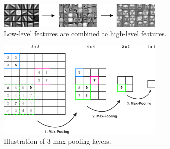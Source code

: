 \begin{figure}
    \begin{subfigure}{1\textwidth}
        \centering
        \includegraphics[width=0.9\textwidth]{resources/images/abstraction.png}
        \caption{Low-level features are combined to high-level features.}
        \label{fig:abstraction}
    \end{subfigure}
    \vspace{0.5cm}
    \begin{subfigure}{0.7\textwidth}
        \centering
        \includegraphics[width=0.9\textwidth]{resources/images/max_pooling.png}
        \caption{Illustration of 3 max pooling layers.}
        \label{fig:max_pooling}
    \end{subfigure}
    \begin{subfigure}{0.25\textwidth}
        \centering

\end{subfigure}
\end{figure}
